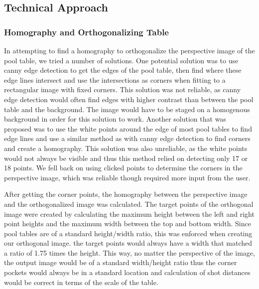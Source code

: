 \documentclass[12pt]{report}
\begin{document}
\subsection*{Technical Approach}
\subsubsection*{Homography and Orthogonalizing Table}
	In attempting to find a homography to orthogonalize the perspective image of the pool table, we tried a number of solutions. One potential solution was to use canny edge detection to get the edges of the pool table, then find where these edge lines intersect and use the intersections as corners when fitting to a rectangular image with fixed corners. This solution was not reliable, as canny edge detection would often find edges with higher contrast than between the pool table and the background. The image would have to be staged on a homogenous background in order for this solution to work. Another solution that was proposed was to use the white points around the edge of most pool tables to find edge lines and use a similar method as with canny edge detection to find corners and create a homography. This solution was also unreliable, as the white points would not always be visible and thus this method relied on detecting only 17 or 18 points. We fell back on using clicked points to determine the corners in the perspective image, which was reliable though required more input from the user. 

	After getting the corner points, the homography between the perspective image and the orthogonalized image was calculated. The target points of the orthogonal image were created by calculating the maximum height between the left and right point heights and the maximum width between the top and bottom width. Since pool tables are of a standard height/width ratio, this was enforced when creating our orthogonal image. the target points would always have a width that matched a ratio of 1.75 times the height. This way, no matter the perspective of the image, the output image would be of a standard width/height ratio thus the corner pockets would always be in a standard location and calculation of shot distances would be correct in terms of the scale of the table.
\end{document}
